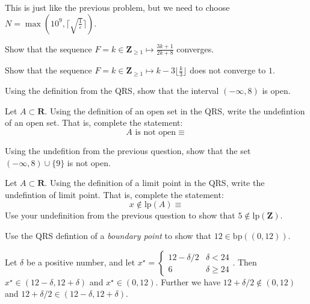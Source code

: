 \documentclass[12pt, fleqn]{exam}
\newcommand{\reals}{\mathbf{R}}
\newcommand{\integers}{\mathbf{Z}}
\newcommand{\bp}{\mathrm{bp}}
\newcommand{\lp}{\mathrm{lp}}
\begin{document}
\begin{questions}
\begin{solution} This is just like the previous problem, but we need to choose $N = \max(10^9,  \lceil \sqrt{\frac{1}{\varepsilon}} \rceil)$.

\end{solution}

\question Show that the sequence $F = k \in \integers_{\geq 1} \mapsto \frac{3 k+ 1}{2 k + 8}$ converges.


\question Show that the sequence $F = k \in \integers_{\geq 1} \mapsto k - 3 \lfloor \frac{k}{3} \rfloor $ does 
not converge to $1$.


\question Using the definition from the QRS, show that the interval $(-\infty, 8)$ is open.

\question Let $A \subset \reals$.  Using the definition of an open set in the QRS, write
the undefintion of an open set. That is, complete the statement:
\begin{equation*}
  A \text{ is not open} \equiv 
\end{equation*}

\question Using the undefition from the previous question, show that the set \mbox{$(-\infty, 8) \cup \{9 \}$} is
not open.

\question Let $A \subset \reals$.  Using the definition of a limit point in the QRS, write
the undefintion of limit point. That is, complete the statement:
\begin{equation*}
  x \not \in \lp(A) \equiv 
\end{equation*}
\question  Use your undefinition from the previous question to show that \(5 \notin  \lp (\integers)\).


\begin{solution}%

\end{solution}

\question  Use the QRS defintion of a \emph{boundary point} to show that $12 \in \bp((0,12))$.


\begin{solution}%
Let \(\delta\) be a positive number, and let \(x^\star = \begin{cases} 12 - \delta/2 & \delta < 24 \\
                                                                      6  & \delta \geq 24 
\end{cases}\). Then \(x^\star \in (12-\delta, 12+ \delta)\) and \(x^\star \in (0,12)\). Further
we have \(12 + \delta /2 \notin (0,12)\) and \(12 + \delta/2 \in (12-\delta, 12+ \delta)\).


\end{solution}
\end{questions}
\end{document}
